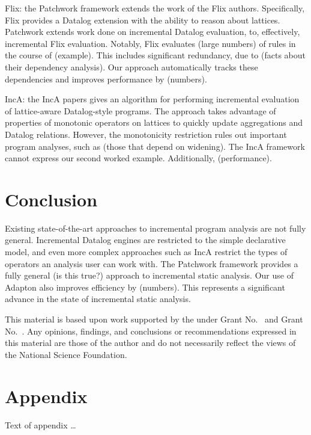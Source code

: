 \documentclass[acmlarge,anonymous]{acmart}\settopmatter{printfolios=true}
\begin{document}
Flix: the Patchwork framework extends the work of the Flix authors. Specifically, Flix provides a Datalog extension with the ability to reason about lattices. Patchwork extends work done on incremental Datalog evaluation, to, effectively, incremental Flix evaluation. Notably, Flix evaluates (large numbers) of rules in the course of (example). This includes significant redundancy, due to (facts about their dependency analysis). Our approach automatically tracks these dependencies and improves performance by (numbers).

IncA: the IncA papers gives an algorithm for performing incremental evaluation of lattice-aware Datalog-style programs. The approach takes advantage of properties of monotonic operators on lattices to quickly update aggregations and Datalog relations. However, the monotonicity restriction rules out important program analyses, such as (those that depend on widening). The IncA framework cannot express our second worked example. Additionally, (performance).

\section{Conclusion}

Existing state-of-the-art approaches to incremental program analysis are not fully general. Incremental Datalog engines are restricted to the simple declarative model, and even more complex approaches such as IncA restrict the types of operators an analysis user can work with. The Patchwork framework provides a fully general (is this true?) approach to incremental static analysis. Our use of Adapton also improves efficiency by (numbers). This represents a significant advance in the state of incremental static analysis.

\begin{acks}                            %
  This material is based upon work supported by the
   under Grant
  No.~ and Grant
  No.~.  Any opinions, findings, and
  conclusions or recommendations expressed in this material are those
  of the author and do not necessarily reflect the views of the
  National Science Foundation.
\end{acks}


%


\appendix
\section{Appendix}

Text of appendix \ldots
\end{document}
